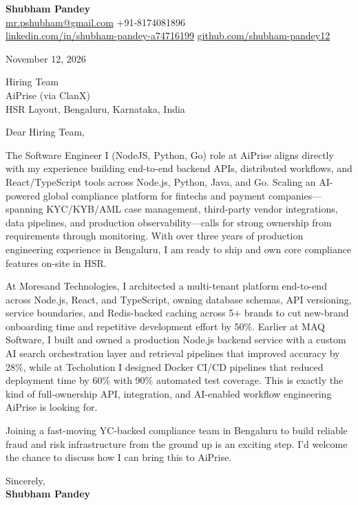 \documentclass[a4paper,11pt]{article}
\begin{document}
\textbf{\Large Shubham Pandey}\\
\href{mailto:mr.pshubham@gmail.com}{mr.pshubham@gmail.com} \quad +91-8174081896\\
\href{https://www.linkedin.com/in/shubham-pandey-a74716199/}{linkedin.com/in/shubham-pandey-a74716199} \quad
\href{https://github.com/shubham-pandey12}{github.com/shubham-pandey12}

\vspace{1em}
November 12, 2026

\vspace{1em}
Hiring Team\\
AiPrise (via ClanX)\\
HSR Layout, Bengaluru, Karnataka, India

\vspace{1em}
Dear Hiring Team,

The Software Engineer I (NodeJS, Python, Go) role at AiPrise aligns directly with my experience building end-to-end backend APIs, distributed workflows, and React/TypeScript tools across Node.js, Python, Java, and Go. Scaling an AI-powered global compliance platform for fintechs and payment companies---spanning KYC/KYB/AML case management, third-party vendor integrations, data pipelines, and production observability---calls for strong ownership from requirements through monitoring. With over three years of production engineering experience in Bengaluru, I am ready to ship and own core compliance features on-site in HSR.

At Moresand Technologies, I architected a multi-tenant platform end-to-end across Node.js, React, and TypeScript, owning database schemas, API versioning, service boundaries, and Redis-backed caching across 5+ brands to cut new-brand onboarding time and repetitive development effort by 50\%. Earlier at MAQ Software, I built and owned a production Node.js backend service with a custom AI search orchestration layer and retrieval pipelines that improved accuracy by 28\%, while at Techolution I designed Docker CI/CD pipelines that reduced deployment time by 60\% with 90\% automated test coverage. This is exactly the kind of full-ownership API, integration, and AI-enabled workflow engineering AiPrise is looking for.

Joining a fast-moving YC-backed compliance team in Bengaluru to build reliable fraud and risk infrastructure from the ground up is an exciting step. I'd welcome the chance to discuss how I can bring this to AiPrise.

\vspace{1em}
Sincerely,\\[0.5em]
\textbf{Shubham Pandey}
\end{document}
